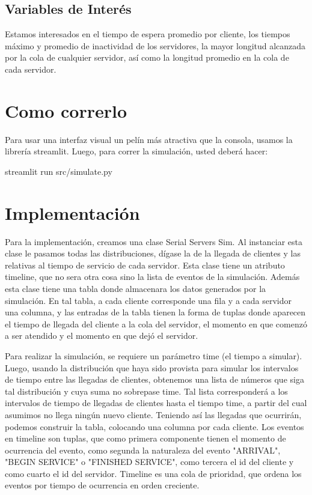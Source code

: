 \documentclass[12pt]{article}
\begin{document}
\subsection{Variables de Interés}
Estamos interesados en el tiempo de espera promedio por cliente, los tiempos máximo y promedio de inactividad de los servidores, la mayor longitud alcanzada por la cola de cualquier servidor, así como la longitud promedio en la cola de cada servidor.

\newpage
\section{Como correrlo}
Para usar una interfaz visual un pelín más atractiva que la consola, usamos la librería streamlit. Luego, para correr la simulación, usted deberá hacer:

streamlit run src/simulate.py
\newpage
\section{Implementación}
Para la implementación, creamos una clase Serial Servers Sim. Al instanciar esta clase le pasamos todas las distribuciones, dígase la de la llegada de clientes y las relativas al tiempo de servicio de cada servidor. Esta clase tiene un atributo timeline, que no sera otra cosa sino la lista de eventos de la simulación. Además esta clase tiene una tabla donde almacenara los datos generados por la simulación. En tal tabla, a cada cliente corresponde una fila y a cada servidor una columna, y las entradas de la tabla tienen la forma de tuplas donde aparecen el tiempo de llegada del cliente a la cola del servidor, el momento en que comenzó a ser atendido y el momento en que dejó el servidor.

Para realizar la simulación, se requiere un parámetro time (el tiempo a simular). Luego, usando la distribución que haya sido provista para simular los intervalos de tiempo entre las llegadas de clientes, obtenemos una lista de números que siga tal distribución y cuya suma no sobrepase time. Tal lista corresponderá a los intervalos de tiempo de llegadas de clientes hasta el tiempo time, a partir del cual asumimos no llega ningún nuevo cliente.
Teniendo así las llegadas que ocurrirán, podemos construir la tabla, colocando una columna por cada cliente.
Los eventos en timeline son tuplas, que como primera componente tienen el momento de ocurrencia del evento, como segunda la naturaleza del evento "ARRIVAL", "BEGIN SERVICE" o "FINISHED SERVICE", como tercera el id del cliente y como cuarto el id del servidor. Timeline es una cola de prioridad, que ordena los eventos por tiempo de ocurrencia en orden creciente.
\end{document}
